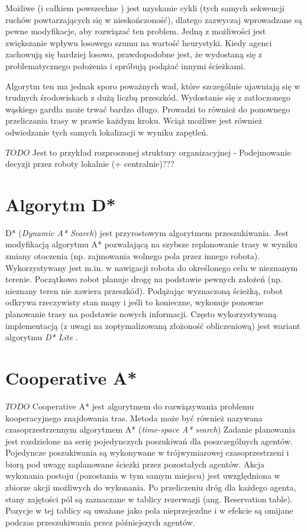 Możliwe (i całkiem powszechne \cite{cooppath}) jest uzyskanie cykli (tych samych sekwencji ruchów powtarzających się w nieskończoność), dlatego zazwyczaj wprowadzane są pewne modyfikacje, aby rozwiązać ten problem. Jedną z możliwości jest zwiększanie wpływu losowego szumu na wartość heurystyki. Kiedy agenci zachowują się bardziej losowo, prawdopodobne jest, że wydostaną się z problematycznego położenia i spróbują podążać innymi ścieżkami.

Algorytm ten ma jednak sporo poważnych wad, które szczególnie ujawniają się w trudnych środowiskach z dużą liczbą przeszkód. Wydostanie się z zatłoczonego wąskiego gardła może trwać bardzo długo. Prowadzi to również do ponownego przeliczania trasy w prawie każdym kroku. Wciąż możliwe jest również odwiedzanie tych samych lokalizacji w wyniku zapętleń.

$TODO$ Jest to przykład rozproszonej struktury organizacyjnej - Podejmowanie decyzji przez roboty lokalnie (+ centralnie)???

\section{Algorytm D*}
\label{ch:dstar}
D* ({\it Dynamic A* Search}) jest przyrostowym algorytmem przeszukiwania. Jest modyfikacją algorytmu A* pozwalającą na szybsze replanowanie trasy w wyniku zmiany otoczenia (np. zajmowania wolnego pola przez innego robota). Wykorzystywany jest m.in. w nawigacji robota do określonego celu w nieznanym terenie. Początkowo robot planuje drogę na podstawie pewnych założeń (np. nieznany teren nie zawiera przeszkód). Podążając wyznaczoną ścieżką, robot odkrywa rzeczywisty stan mapy i jeśli to konieczne, wykonuje ponowne planowanie trasy na podstawie nowych informacji.
Często wykorzystywaną implementacją (z uwagi na zoptymalizowaną złożoność obliczeniową) jest wariant algorytmu {\it D* Lite} \cite{dstarlite}.

\section{Cooperative A*}
$TODO$
Cooperative A* jest algorytmem do rozwiązywania problemu kooperacyjnego znajdowania tras.
Metoda może być również nazywana czasoprzestrzennym algorytmem A* ({\it time-space A* search})
Zadanie planowania jest rozdzielone na serię pojedynczych poszukiwań dla poszczególnych agentów.
Pojedyncze poszukiwania są wykonywane w trójwymiarowej czasoprzestrzeni i biorą pod uwagę zaplanowane ścieżki przez pozostałych agentów.
Akcja wykonania postoju (pozostania w tym samym miejscu) jest uwzględniona w zbiorze akcji możliwych do wykonania.
Po przeliczeniu dróg dla każdego agenta, stany zajętości pól są zaznaczane w tablicy rezerwazji (ang. Reservation table).
Pozycje w tej tablicy są uważane jako pola nieprzejezdne i w efekcie są omijane podczas przeszukiwania przez późniejszych agentów. \cite{cooppath}

